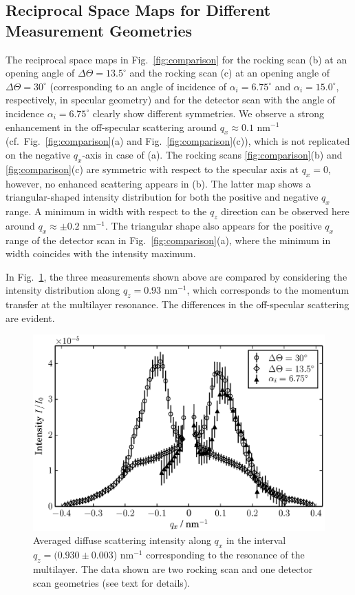 \documentclass[twocolumn,osajnl,showpacs,superscriptaddress,11pt]{revtex4-1}
\begin{document}
\subsection{Reciprocal Space Maps for Different Measurement Geometries} The reciprocal space maps in Fig.~\ref{fig:comparison} for the rocking scan (b) at an opening angle of $\Delta \Theta = 13.5^\circ$ and the rocking scan (c) at an opening angle of $\Delta \Theta = 30^\circ$ (corresponding to an angle of incidence of $\alpha_i = 6.75^\circ$ and $\alpha_i = 15.0^\circ$, respectively, in specular geometry) and for the detector scan with the angle of incidence $\alpha_i = 6.75^\circ$ clearly show different symmetries. We observe a strong enhancement in the off-specular scattering around $q_x\approx0.1$ nm$^{-1}$ (cf.~Fig.~\ref{fig:comparison}(a) and Fig.~\ref{fig:comparison}(c)), which is not replicated on the negative $q_x$-axis in case of (a). The rocking scans \ref{fig:comparison}(b) and \ref{fig:comparison}(c) are symmetric with respect to the specular axis at $q_x=0$, however, no enhanced scattering appears in (b). The latter map shows a triangular-shaped intensity distribution for both the positive and 
negative $q_x$ range. A minimum in width with respect to the $q_z$ direction can be observed here around $q_x \approx \pm 0.2$ nm$^{-1}$. The triangular shape also appears for the 
positive $q_x$ range 
of the detector scan in Fig.~\ref{fig:comparison}(a), where the minimum in width coincides with the intensity maximum.


In Fig.~\ref{fig:BraggSheet_DetectorAndRocking}, the three measurements shown above are compared by considering the intensity distribution along $q_z=0.93$ nm$^{-1}$, which corresponds to the momentum transfer at the multilayer resonance. The differences in the off-specular scattering are evident. 
\begin{figure}
	\includegraphics[width=0.5
	\textwidth]{BraggSheet_DetectorAndRocking} \caption{Averaged diffuse scattering intensity along $q_x$ in the interval  $q_z=(0.930 \pm 0.003$) nm$^{-1}$ corresponding to the resonance of the multilayer. The data shown are two rocking scan and one detector scan geometries (see text for details).} \label{fig:BraggSheet_DetectorAndRocking} 
\end{figure}
\end{document}

